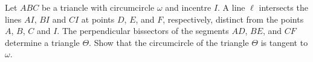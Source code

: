 Let $ABC$ be a triancle with circumcircle $\omega$ and incentre $I$. A line $\ell$ intersects the lines $AI$, $BI$ and $CI$ at points $D$, $E$, and $F$, respectively, distinct from the points $A$, $B$, $C$ and $I$. The perpendicular bissectors of the segments $AD$, $BE$, and $CF$ determine a triangle $\Theta$. Show that the circumcircle of the triangle $\Theta$ is tangent to $\omega$.
